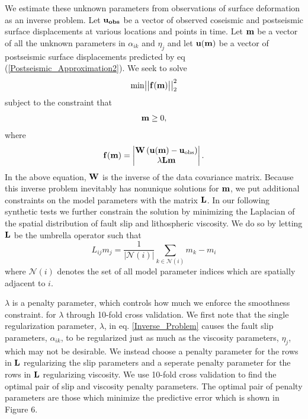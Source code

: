 \documentclass[12pt]{article}
\begin{document}
We estimate these unknown parameters from observations of surface
deformation as an inverse problem. Let $\bold{u_{obs}}$ be a vector
of observed coseismic and postseismic surface displacements at various
locations and points in time.  Let $\bold{m}$ be a vector of all the
unknown parameters in $\alpha_{ik}$ and $\eta_j$ and let $\bold{u(m)}$
be a vector of postseismic surface displacements predicted by eq
(\ref{Postseismic_Approximation2}). We seek to solve
\begin{equation}\label{Inverse_Problem}
  \mathrm{min}
  \big|\big|\bold{f(m)}\big|\big|_2^2
\end{equation}
subject to the constraint that
\begin{equation}
  \bold{m}\geq0,
\end{equation}
where 
\begin{equation}
  \bold{f(m)} = 
    \begin{vmatrix}
      \bold{W}\left(\bold{u(m)}-\bold{u}_{\mathrm{obs}}\right)\\
      \lambda\bold{Lm}\\
    \end{vmatrix} .
\end{equation}  
In the above equation, $\bold{W}$ is the inverse of the data
covariance matrix. Because this inverse problem inevitably has
nonunique solutions for $\bold{m}$, we put additional constraints on
the model parameters with the matrix $\bold{L}$.  In our following
synthetic tests we further constrain the solution by minimizing the
Laplacian of the spatial distribution of fault slip and lithospheric
viscosity.  We do so by letting $\bold{L}$ be the umbrella operator
\citep{D1999} such that
\begin{equation}
  L_{ij}m_j = \frac{1}{|\mathcal{N}(i)|}\sum_{k\in \mathcal{N}(i)} m_k - m_i
\end{equation}
where $\mathcal{N}(i)$ denotes the set of all model parameter indices
which are spatially adjacent to $i$.

$\lambda$ is a penalty parameter, which controls how much we enforce
the smoothness constraint.  for $\lambda$ through 10-fold cross
validation. We first note that the single regularization parameter,
$\lambda$, in eq. \ref{Inverse_Problem} causes the fault slip
parameters, $\alpha_{ik}$, to be regularized just as much as the
viscosity parameters, $\eta_j$, which may not be desirable.  We
instead choose a penalty parameter for the rows in $\bold{L}$
regularizing the slip parameters and a seperate penalty parameter for
the rows in $\bold{L}$ regularizing viscosity.  We use 10-fold cross
validation to find the optimal pair of slip and viscosity penalty
parameters. The optimal pair of penalty parameters are those which
minimize the predictive error which is shown in Figure 6.
\end{document}
